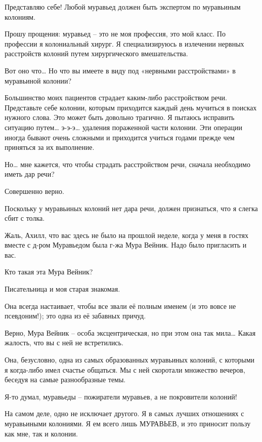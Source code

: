 \documentclass[../main.tex]{subfiles}
\begin{document}
\begin{dialogue}
 Представляю себе! Любой муравьед должен быть экспертом по муравьиным колониям.

 Прошу прощения: муравьед \--- это не моя профессия, это мой класс. По профессии я колониальный хирург. Я специализируюсь в излечении нервных расстройств колоний путем хирургического вмешательства.

 Вот оно что\ldots{} Но что вы имеете в виду под «нервными расстройствами» в муравьиной колонии?

 Большинство моих пациентов страдает каким-либо расстройством речи. Представьте себе колонии, которым приходится каждый день мучиться в поисках нужного слова. Это может быть довольно трагично. Я пытаюсь исправить ситуацию путем\ldots{} э-э-э\ldots{} удаления пораженной части колонии. Эти операции иногда бывают очень сложными и приходится учиться годами прежде чем приняться за их выполнение.

 Но\ldots{} мне кажется, что чтобы страдать расстройством речи, сначала необходимо иметь дар речи?

 Совершенно верно.

 Поскольку у муравьиных колоний нет дара речи, должен признаться, что я слегка сбит с толка.

 Жаль, Ахилл, что вас здесь не было на прошлой неделе, когда у меня в гостях вместе с д-ром Муравьедом была г-жа Мура Вейник. Надо было пригласить и вас.

 Кто такая эта Мура Вейник?

 Писательница и моя старая знакомая.

 Она всегда настаивает, чтобы все звали её полным именем (и это вовсе не псевдоним!); это одна из её забавных причуд.

 Верно, Мура Вейник \--- особа эксцентрическая, но при этом она так мила\ldots{} Какая жалость, что вы с ней не встретились.

 Она, безусловно, одна из самых образованных муравьиных колоний, с которыми я когда-либо имел счастье общаться. Мы с ней скоротали множество вечеров, беседуя на самые разнообразные темы.

 Я-то думал, муравьеды \--- пожиратели муравьев, а не покровители колоний!

 На самом деле, одно не исключает другого. Я в самых лучших отношениях с муравьиными колониями. Я ем всего лишь МУРАВЬЕВ, и это приносит пользу как мне, так и колонии.


\end{dialogue}
\end{document}
